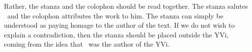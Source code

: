 Rather, the stanza and the colophon should be read together.
The stanza salutes \Sankara\ and the colophon attributes the work to him. The stanza can simply be understood as paying homage to the author of the text. If we do not wish to explain a contradiction, then the stanza should be placed outside the YVi, coming from the idea that \Sankara\ was the author of the YVi.
%


